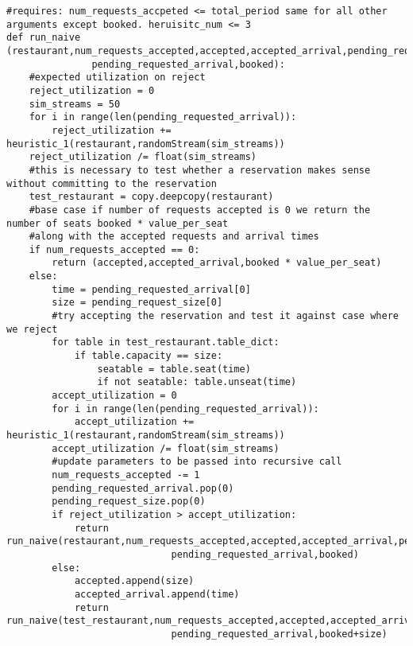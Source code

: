 \documentclass[12pt, titlepage]{article}
\begin{document}
\begin{Verbatim}[fontsize=\scriptsize]
#requires: num_requests_accpeted <= total_period same for all other arguments except booked. heruisitc_num <= 3
def run_naive (restaurant,num_requests_accepted,accepted,accepted_arrival,pending_request_size,
               pending_requested_arrival,booked):
    #expected utilization on reject
    reject_utilization = 0
    sim_streams = 50
    for i in range(len(pending_requested_arrival)):
        reject_utilization += heuristic_1(restaurant,randomStream(sim_streams))
    reject_utilization /= float(sim_streams)
    #this is necessary to test whether a reservation makes sense without committing to the reservation
    test_restaurant = copy.deepcopy(restaurant)
    #base case if number of requests accepted is 0 we return the number of seats booked * value_per_seat
    #along with the accepted requests and arrival times
    if num_requests_accepted == 0:
        return (accepted,accepted_arrival,booked * value_per_seat)
    else:
        time = pending_requested_arrival[0]
        size = pending_request_size[0]
        #try accepting the reservation and test it against case where we reject
        for table in test_restaurant.table_dict:
            if table.capacity == size:
                seatable = table.seat(time)
                if not seatable: table.unseat(time)
        accept_utilization = 0  
        for i in range(len(pending_requested_arrival)):
            accept_utilization += heuristic_1(restaurant,randomStream(sim_streams))
        accept_utilization /= float(sim_streams)
        #update parameters to be passed into recursive call
        num_requests_accepted -= 1
        pending_requested_arrival.pop(0)
        pending_request_size.pop(0)
        if reject_utilization > accept_utilization:
            return run_naive(restaurant,num_requests_accepted,accepted,accepted_arrival,pending_request_size,
                             pending_requested_arrival,booked)
        else:
            accepted.append(size)
            accepted_arrival.append(time)
            return run_naive(test_restaurant,num_requests_accepted,accepted,accepted_arrival,pending_request_size,
                             pending_requested_arrival,booked+size)



\end{Verbatim}
\end{document}
